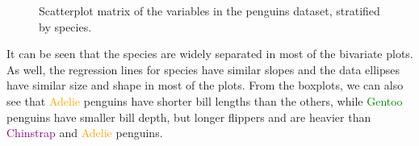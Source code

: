 \documentclass[
  letterpaper,
  10pt,
  krantz2]{krantz}
\begin{document}
{\begin{figure}[H]


\caption{\label{fig-peng-spm}Scatterplot matrix of the variables in the
penguins dataset, stratified by species.}

\end{figure}%

It can be seen that the species are widely separated in most of the
bivariate plots. As well, the regression lines for species have similar
slopes and the data ellipses have similar size and shape in most of the
plots. From the boxplots, we can also see that
\textcolor{orange}{Adelie} penguins have shorter bill lengths than the
others, while \textcolor{green}{Gentoo} penguins have smaller bill
depth, but longer flippers and are heavier than
\textcolor{purple}{Chinstrap} and \textcolor{orange}{Adelie} penguins.

\begin{tcolorbox}[enhanced jigsaw, colback=white, titlerule=0mm, toprule=.15mm, opacityback=0, leftrule=.75mm, opacitybacktitle=0.6, left=2mm, arc=.35mm, colframe=quarto-callout-note-color-frame, breakable, bottomtitle=1mm, toptitle=1mm, title=\textcolor{quarto-callout-note-color}{\faInfo}\hspace{0.5em}{Looking ahead}, rightrule=.15mm, bottomrule=.15mm, coltitle=black, colbacktitle=quarto-callout-note-color!10!white]


\end{tcolorbox}}
\end{document}
